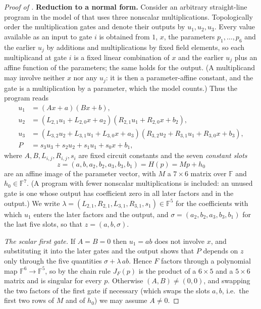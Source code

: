 \begin{proof}[Proof of ]
\medskip
\noindent\textbf{Reduction to a normal form.}
Consider an arbitrary straight-line program in the model of  that uses
three nonscalar multiplications.
Topologically order the multiplication gates and denote their outputs by $u_1,u_2,u_3$.
Every value available as an input to gate $i$ is obtained from $1$, $x$, the parameters
$p_1,\dots,p_6$ and the earlier $u_j$ by additions and multiplications by fixed field
elements, so each multiplicand at gate $i$ is a fixed linear combination of $x$ and the
earlier $u_j$ plus an affine function of the parameters; the same holds for the output.
(A multiplicand may involve neither $x$ nor any $u_j$: it is then a parameter-affine
constant, and the gate is a multiplication by a parameter, which the model counts.)
Thus the program reads
\begin{align}
   u_1 &= (Ax+a)(Bx+b),\\
   u_2 &= (L_{2,1}u_1+L_{2,0}x+a_2)(R_{2,1}u_1+R_{2,0}x+b_2),\\
   u_3 &= (L_{3,2}u_2+L_{3,1}u_1+L_{3,0}x+a_3)(R_{3,2}u_2+R_{3,1}u_1+R_{3,0}x+b_3),\\
   P &= s_3u_3+s_2u_2+s_1u_1+s_0x+b_1,
\end{align}
where $A,B,L_{i,j},R_{i,j},s_i$ are fixed circuit constants and the seven
\emph{constant slots}
\[
   z=(a,b,a_2,b_2,a_3,b_3,b_1)=H(p)=Mp+h_0
\]
are an affine image of the parameter vector, with $M$ a $7\times6$ matrix over
$\mathbb{F}$ and $h_0\in\mathbb{F}^7$.  (A program with fewer nonscalar multiplications
is included: an unused gate is one whose output has coefficient zero in all later factors
and in the output.)  We write $\lambda=(L_{2,1},R_{2,1},L_{3,1},R_{3,1},s_1)\in\mathbb{F}^5$
for the coefficients with which $u_1$ enters the later factors and the output, and
$\sigma=(a_2,b_2,a_3,b_3,b_1)$ for the last five slots, so that $z=(a,b,\sigma)$.

\smallskip
\noindent\textit{The scalar first gate.}
If $A=B=0$ then $u_1=ab$ does not involve $x$, and substituting it into the later gates
and the output shows that $P$ depends on $z$ only through the five quantities
$\sigma+\lambda\,ab$.  Hence $F$ factors through a polynomial map
$\mathbb{F}^6\to\mathbb{F}^5$, so by the chain rule $J_F(p)$ is the product of a
$6\times5$ and a $5\times6$ matrix and is singular for every $p$.  Otherwise
$(A,B)\neq(0,0)$, and swapping the two factors of the first gate if necessary (which
swaps the slots $a,b$, i.e.\ the first two rows of $M$ and of $h_0$) we may assume
$A\neq0$.


\end{proof}
